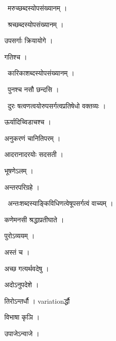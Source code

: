 \documentclass[10pt, openany, oneside]{book}
\begin{document}
\par\noindent\hspace{1.5em}{\vps वा॰}~{\qt मरुच्छब्दस्योपसंख्यानम् ।}

\par\noindent\hspace{1.5em}{\vps वा॰}~{\qt श्रच्छब्दस्योपसंख्यानम् ।}

\noindent उपसर्गाः क्रियायोगे ।

\noindent गतिश्च ।

\par\noindent\hspace{1.5em}{\vps वा॰}~{\qt कारिकाशब्दस्योपसंख्यानम् ।}

\par\noindent\hspace{1.5em}{\vps वा॰}~{\qt पुनश्च नसौ छन्दसि ।}

\par\noindent\hspace{1.5em}{\vps वा॰}~{\qt दुरः षत्वणत्वयोरुपसर्गत्वप्रतिषेधो वक्तव्यः ।}

\noindent ऊर्यादिच्विडाचश्च ।

\noindent अनुकरणं चानितिपरम् ।

\noindent आदरानादरयोः सदसती ।

\noindent भूषणेऽलम् ।

\noindent अन्तरपरिग्रहे ।

\par\noindent\hspace{1.5em}{\vps वा॰}~{\qt अन्तःशब्दस्याङ्किविधिणत्वेषूपसर्गत्वं वाच्यम् ।}

\noindent कणेमनसी श्रद्धाप्रतीघाते ।

\noindent पुरोऽव्ययम् ।

\noindent अस्तं च ।

\noindent अच्छ गत्यर्थवदेषु ।

\noindent अदोऽनुपदेशे ।

\noindent तिरोऽन्तर्धौ । variationर्द्धौ

\noindent विभाषा कृञि ।

\noindent उपाजेऽन्वाजे ।
\end{document}
